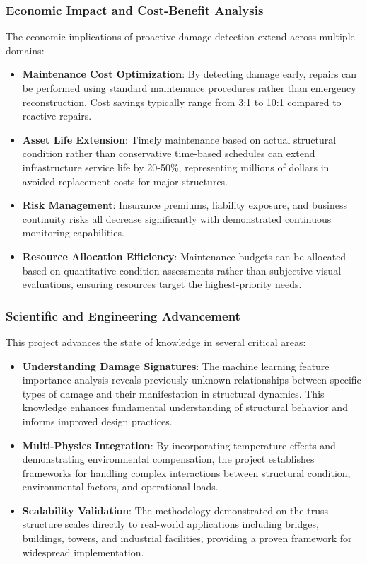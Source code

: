 \documentclass[11pt,a4paper]{article}
\begin{document}
\subsubsection{Economic Impact and Cost-Benefit Analysis}

The economic implications of proactive damage detection extend across multiple domains:

\begin{itemize}
    \item \textbf{Maintenance Cost Optimization}: By detecting damage early, repairs can be performed using standard maintenance procedures rather than emergency reconstruction. Cost savings typically range from 3:1 to 10:1 compared to reactive repairs.
    
    \item \textbf{Asset Life Extension}: Timely maintenance based on actual structural condition rather than conservative time-based schedules can extend infrastructure service life by 20-50\%, representing millions of dollars in avoided replacement costs for major structures.
    
    \item \textbf{Risk Management}: Insurance premiums, liability exposure, and business continuity risks all decrease significantly with demonstrated continuous monitoring capabilities.
    
    \item \textbf{Resource Allocation Efficiency}: Maintenance budgets can be allocated based on quantitative condition assessments rather than subjective visual evaluations, ensuring resources target the highest-priority needs.
\end{itemize}

\subsubsection{Scientific and Engineering Advancement}

This project advances the state of knowledge in several critical areas:

\begin{itemize}
    \item \textbf{Understanding Damage Signatures}: The machine learning feature importance analysis reveals previously unknown relationships between specific types of damage and their manifestation in structural dynamics. This knowledge enhances fundamental understanding of structural behavior and informs improved design practices.
    
    \item \textbf{Multi-Physics Integration}: By incorporating temperature effects and demonstrating environmental compensation, the project establishes frameworks for handling complex interactions between structural condition, environmental factors, and operational loads.
    
    \item \textbf{Scalability Validation}: The methodology demonstrated on the truss structure scales directly to real-world applications including bridges, buildings, towers, and industrial facilities, providing a proven framework for widespread implementation.
\end{itemize}
\end{document}
